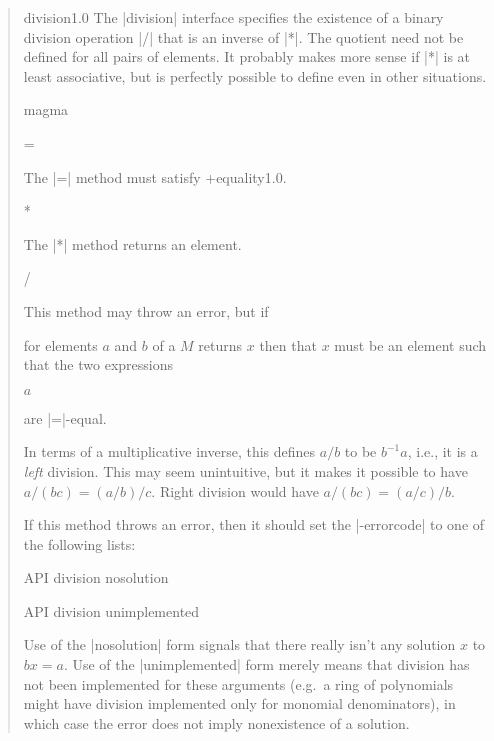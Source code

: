 \documentclass{mtmtcl}
\theoremstyle{plain}
\theoremstyle{remark}
\begin{document}
\begin{quote}
  \small\leavevmode
  \begin{APIspec}{division}{1.0}
    The |division| interface specifies the existence of a binary 
    division operation |/| that is an inverse of |*|. The quotient 
    need not be defined for all pairs of elements. It probably makes 
    more sense if |*| is at least associative, but is perfectly 
    possible to define even in other situations.
    \begin{APIdescription}{magma}
      \begin{APImethod}{=}
         
      \end{APImethod}
        The |=| method must satisfy \APIref+{equality}{1.0}.
      \begin{APImethod}{*}
         
      \end{APImethod}
        The |*| method returns an element.
      \begin{APImethod}{/}
         
      \end{APImethod}
        This method may throw an error, but if
        \begin{displaysyntax}
          [$M$ / $a$ $b$]
        \end{displaysyntax}
        for elements $a$ and $b$ of a  $M$ returns $x$ 
        then that $x$ must be an element such that the two expressions
        \begin{displaysyntax}
          [$M$ * $b$ $x$]\par
          $a$
        \end{displaysyntax}
        are |=|-equal.
        
        \begin{remark}
          In terms of a multiplicative inverse, this defines $a/b$ 
          to be $b^{-1}a$, i.e., it is a \emph{left} division. This 
          may seem unintuitive, but it makes it possible to have 
          \(a/(bc) = (a/b)/c\). Right division would have \(a/(bc) = 
          (a/c)/b\).
        \end{remark}
        
        If this method throws an error, then it should set the 
        |-errorcode| to one of the following lists:
        \begin{displaysyntax}
          API division nosolution\par
          API division unimplemented
        \end{displaysyntax}
        Use of the |nosolution| form signals that there really isn't 
        any solution $x$ to \(bx=a\). Use of the |unimplemented| form 
        merely means that division has not been implemented for these 
        arguments (e.g.~a ring of polynomials might have division 
        implemented only for monomial denominators), in which case 
        the error does not imply nonexistence of a solution.
    \end{APIdescription}
    

\end{APIspec}
\end{quote}
\end{document}
